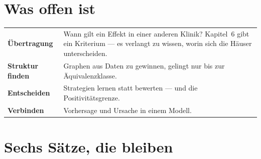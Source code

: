 \section{Was offen ist}

\begin{merksatz}
\begin{center}
{\small
\renewcommand{\arraystretch}{1.55}
\begin{tabular}{@{}P{3.0cm}P{5.6cm}@{}}
\toprule
\textbf{Übertragung} & Wann gilt ein Effekt in einer anderen Klinik? Kapitel~6 gibt ein Kriterium --- es verlangt zu wissen, worin sich die Häuser unterscheiden.\\
\textbf{Struktur finden} & Graphen aus Daten zu gewinnen, gelingt nur bis zur Äquivalenzklasse.\\
\textbf{Entscheiden} & Strategien lernen statt bewerten --- und die Positivitätsgrenze.\\
\textbf{Verbinden} & Vorhersage und Ursache in einem Modell.\\
\bottomrule
\end{tabular}}
\end{center}

\begin{center}
\begin{minipage}{0.88\textwidth}
\end{minipage}
\end{center}
\end{merksatz}

\section{Sechs Sätze, die bleiben}

